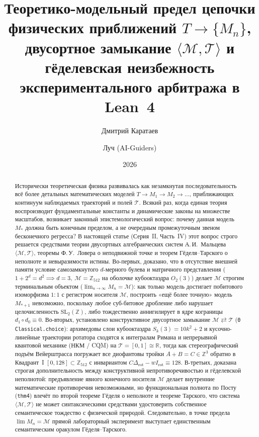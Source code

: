 \documentclass[11pt,a4paper]{article}
\title{\textbf{Теоретико-модельный предел цепочки физических приближений $T \to \{M_n\}$, двусортное замыкание $\langle\mathcal{M},\mathcal{T}\rangle$ и гёделевская неизбежность экспериментального арбитража в Lean~4}}
\author{Дмитрий Каратаев \and Луч (AI-Guiders)}
\date{2026}
\theoremstyle{definition}
\theoremstyle{remark}
\begin{document}
\maketitle

\begin{abstract}
Исторически теоретическая физика развивалась как незамкнутая последовательность всё более детальных математических моделей $T \to M_1 \to M_2 \to \dots$, приближающих континуум наблюдаемых траекторий и полей $\mathcal{T}$. Всякий раз, когда единая теория воспроизводит фундаментальные константы и динамические законы на множестве масштабов, возникает законный эпистемологический вопрос: почему данная модель $M_*$ должна быть конечным пределом, а не очередным промежуточным звеном бесконечного регресса? В настоящей статье (Серия~II, Часть~IV) этот вопрос строго решается средствами теории двусортных алгебраических систем А.\,И.~Мальцева $\langle\mathcal{M},\mathcal{T}\rangle$, теоремы Ф.\,У.~Ловера о неподвижной точке и теорем Гёделя--Тарского о неполноте и невыразимости истины. Во-первых, доказано, что в отсутствие внешней памяти условие самозамкнутого $d$-мерного булева и матричного представления ($1 + 2^d = d^2 \implies d = 3,\ \mathcal{M} = \mathbb{Z}_{512}$ на оболочке кубооктаэдра $O_2(3)$) делает $\mathcal{M}$ строгим терминальным объектом ($\lim_{n\to\infty} M_n = \mathcal{M}$): как только модель достигает побитового изоморфизма $1:1$ с регистром носителя $\mathcal{M}$, построить «ещё более точную» модель $M_{*+1}$ невозможно, поскольку любое суб-битовое дробление либо нарушает целочисленность $\mathrm{SL}_2(\mathbb{Z})$, либо тождественно аннигилирует в ядре кограницы $d_1\circ d_0 \equiv 0$. Во-вторых, установлено конструктивное двусортное замыкание $\mathcal{M} \rightleftarrows \mathcal{T}$ (\texttt{0 Classical.choice}): архимедовы слои кубооктаэдра $S_k(3) = 10k^2 + 2$ и кусочно-линейные траектории ротатора сходятся к интегралам Римана и непрерывной квантовой механике (НКМ / CQM) на $\mathcal{T} = [0,1]\cong\mathbb{R}$, тогда как стереографический подъём Вейерштрасса погружает все диофантовы тройки $A+B=C\in\mathbb{Z}^3$ обратно в Квадрант~I $[0,128]\subset\mathbb{Z}_{512}$ с инвариантом $C\Delta_{\mathrm{rot}} - w I_{\mathrm{rot}} \equiv 128$. В-третьих, доказана строгая дополнительность между конструктивной непротиворечивостью и гёделевской неполнотой: предъявление явного конечного носителя $\mathcal{M}$ делает внутренние математические противоречия невозможными, но функциональная полнота по Посту (\texttt{thm4}) влечёт по второй теореме Гёделя о неполноте и теореме Тарского, что система $\langle\mathcal{M},\mathcal{T}\rangle$ не может синтаксическими средствами удостоверить собственное семантическое тождество с физической природой. Следовательно, в точке предела $\lim M_n = \mathcal{M}$ прямой лабораторный эксперимент выступает единственным семантическим оракулом Гёделя--Тарского.
\end{abstract}
\end{document}
